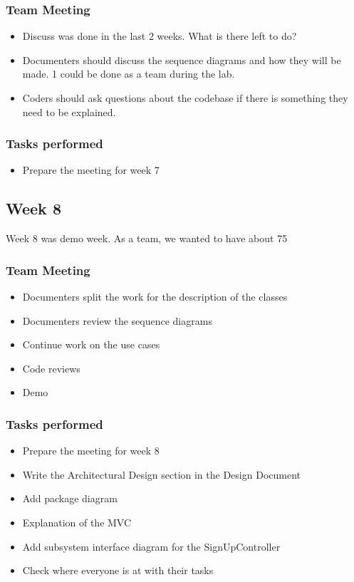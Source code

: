 \documentclass[12pt]{article}
\begin{document}
\subsubsection{Team Meeting}
\begin{itemize}
    \item Discuss was done in the last 2 weeks. What is there left to do?
    \item Documenters should discuss the sequence diagrams and how they will be made. 1 could be done as a team during the lab.
    \item Coders should ask questions about the codebase if there is something they need to be explained.
\end{itemize}

\subsubsection{Tasks performed}
\begin{itemize}
    \item Prepare the meeting for week 7
\end{itemize}

\subsection{Week 8}
Week 8 was demo week. As a team, we wanted to have about 75%

\subsubsection{Team Meeting}
\begin{itemize}
    \item Documenters split the work for the description of the classes
    \item Documenters review the sequence diagrams
    \item Continue work on the use cases
    \item Code reviews
    \item Demo
\end{itemize}

\subsubsection{Tasks performed}
\begin{itemize}
    \item Prepare the meeting for week 8
    \item Write the Architectural Design section in the Design Document
    \item Add package diagram
    \item Explanation of the MVC
    \item Add subsystem interface diagram for the SignUpController
    \item Check where everyone is at with their tasks
\end{itemize}
\end{document}

